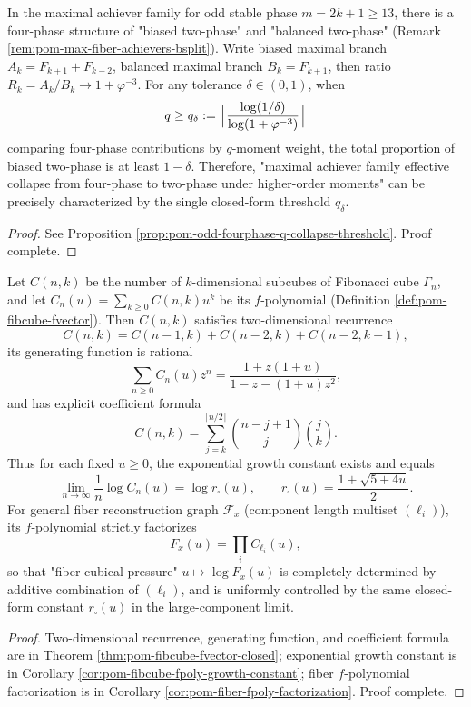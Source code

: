 \begin{conclusion}\label{con:xi-terminal-odd-fourphase-two-phase-collapse-threshold}
In the maximal achiever family for odd stable phase \(m=2k+1\ge 13\), there is a four-phase structure of "biased two-phase" and "balanced two-phase" (Remark \ref{rem:pom-max-fiber-achievers-bsplit}).
Write biased maximal branch
\(
A_k=F_{k+1}+F_{k-2}
\),
balanced maximal branch
\(
B_k=F_{k+1}
\),
then ratio \(R_k=A_k/B_k\to 1+\varphi^{-3}\).
For any tolerance \(\delta\in(0,1)\), when
\[
q\ge q_\delta:=\Bigl\lceil \frac{\log(1/\delta)}{\log(1+\varphi^{-3})}\Bigr\rceil
\]
comparing four-phase contributions by \(q\)-moment weight, the total proportion of biased two-phase is at least \(1-\delta\).
Therefore, "maximal achiever family effective collapse from four-phase to two-phase under higher-order moments" can be precisely characterized by the single closed-form threshold \(q_\delta\).
\end{conclusion}
\begin{proof}[Proof]
See Proposition \ref{prop:pom-odd-fourphase-q-collapse-threshold}. Proof complete.
\end{proof}

\begin{conclusion}[Cubical geometry pressure of time fiber: factorization of \texorpdfstring{$F_x(u)$}{F_x(u)} and growth constant \texorpdfstring{$r_\square(u)=\frac{1+\sqrt{5+4u}}{2}$}{r_square(u)=(1+sqrt(5+4u))/2}]\label{con:xi-terminal-timefiber-cubical-pressure-factorization}
Let \(C(n,k)\) be the number of \(k\)-dimensional subcubes of Fibonacci cube \(\Gamma_n\), and let \(C_n(u)=\sum_{k\ge 0}C(n,k)u^k\) be its \(f\)-polynomial (Definition \ref{def:pom-fibcube-fvector}).
Then \(C(n,k)\) satisfies two-dimensional recurrence
\[
C(n,k)=C(n-1,k)+C(n-2,k)+C(n-2,k-1),
\]
its generating function is rational
\[
\sum_{n\ge 0}C_n(u)z^n=\frac{1+z(1+u)}{1-z-(1+u)z^2},
\]
and has explicit coefficient formula
\[
C(n,k)=\sum_{j=k}^{\lceil n/2\rceil}\binom{n-j+1}{j}\binom{j}{k}.
\]
Thus for each fixed \(u\ge 0\), the exponential growth constant exists and equals
\[
\lim_{n\to\infty}\frac1n\log C_n(u)=\log r_\square(u),\qquad r_\square(u)=\frac{1+\sqrt{5+4u}}{2}.
\]
For general fiber reconstruction graph \(\mathcal F_x\) (component length multiset \((\ell_i)\)), its \(f\)-polynomial strictly factorizes
\[
F_x(u)=\prod_i C_{\ell_i}(u),
\]
so that "fiber cubical pressure" \(u\mapsto \log F_x(u)\) is completely determined by additive combination of \((\ell_i)\), and is uniformly controlled by the same closed-form constant \(r_\square(u)\) in the large-component limit.
\end{conclusion}
\begin{proof}[Proof]
Two-dimensional recurrence, generating function, and coefficient formula are in Theorem \ref{thm:pom-fibcube-fvector-closed};
exponential growth constant is in Corollary \ref{cor:pom-fibcube-fpoly-growth-constant};
fiber \(f\)-polynomial factorization is in Corollary \ref{cor:pom-fiber-fpoly-factorization}. Proof complete.
\end{proof}

